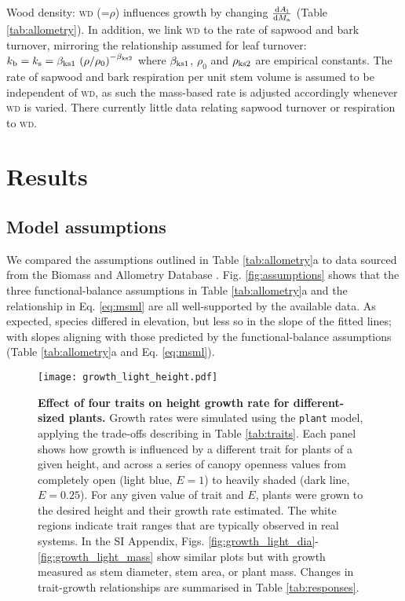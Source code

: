 \documentclass[9pt,twocolumn,twoside,lineno]{pnas-new}
\newcommand{\plant}{\texttt{plant}}
\newcommand{\wood}{\textsc{wd}}
\begin{document}
Wood density: {\wood} (=$\rho$) influences growth by changing $\frac{{\rm d}A_{\rm l}}{{\rm d}M_{\rm a}}$ (Table \ref{tab:allometry}). In addition, we link {\wood} to the rate of sapwood and bark turnover, mirroring the relationship assumed for leaf turnover: $k_{\rm b} = k_{\rm s} = \beta_{{\rm ks1}} \, \left(\rho / \rho_0\right)^{-\beta_{{\rm ks2}}}$ where $\beta_{{\rm ks1}}$, $\rho_0$ and $\rho_{{\rm ks2}}$ are empirical constants. The rate of sapwood and bark respiration per unit stem volume is assumed to be independent of {\wood}, as such the mass-based rate is adjusted accordingly whenever {\wood} is varied. There currently little data relating sapwood turnover or respiration to {\wood}.

\section*{Results}

\subsection*{Model assumptions}

We compared the assumptions outlined in Table \ref{tab:allometry}a to data sourced from the Biomass and Allometry Database \citep{Falster-2015b}. Fig. \ref{fig:assumptions} shows that the three functional-balance assumptions in Table \ref{tab:allometry}a and the relationship in Eq. \ref{eq:msml} are all well-supported by the available data. As expected, species differed in elevation, but less so in the slope of the fitted lines; with slopes aligning with those predicted by the functional-balance assumptions (Table \ref{tab:allometry}a and Eq. \ref{eq:msml}).

\begin{SCfigure*}[\sidecaptionrelwidth][!ht]
\centering
\texttt{[image: growth\_light\_height.pdf]}
\caption{\textbf{Effect of four traits on height growth rate for different-sized plants.}
Growth rates were simulated using the {\plant} model, applying the trade-offs describing in Table \ref{tab:traits}. Each panel shows how growth is influenced by a different trait for plants of a given height, and across a series of canopy openness values from completely open (light blue,  $E=1$) to heavily shaded (dark line, $E=0.25$). For any given value of trait and $E$, plants were grown to the desired height and their growth rate estimated. The white regions indicate trait ranges that are typically observed in real systems. In the SI Appendix, Figs. \ref{fig:growth_light_dia}-\ref{fig:growth_light_mass} show similar plots but with growth measured as stem diameter, stem area, or plant mass. Changes in trait-growth relationships are summarised in Table \ref{tab:responses}.
\label{fig:growth_light_height}}
\end{SCfigure*}
\end{document}
